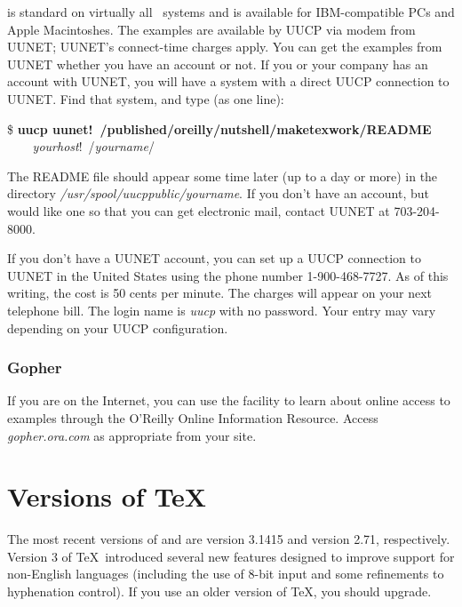  is standard on virtually all \Unix\ systems
and is available for IBM-compatible PCs and Apple Macintoshes. The examples
are available by UUCP via modem from UUNET; UUNET's connect-time charges
apply. You can get the examples from UUNET whether you have an account or
not. If you or your company has an account with UUNET, you will have a system
with a direct UUCP connection to UUNET. Find that system, and type (as one
line):

\begin{ttindent}
\$ \textbf{uucp uunet\ttbackslash!~/published/oreilly/nutshell/maketexwork/README \ttbackslash} 
\textit{\ \ \ \ yourhost}\ttbackslash!~/\textit{yourname}/
\end{ttindent}

The README file should appear some time later (up to a day or more) in the
directory {\it /usr/spool/uucppublic/yourname}. If you don't have an account,
but would like one so that you can get electronic mail, contact UUNET at
703-204-8000.

If you don't have a UUNET account, you can set up a UUCP connection to UUNET
in the United States using the phone number 1-900-468-7727. As of this
writing, the cost is 50 cents per minute. The charges will appear on your next
telephone bill. The login name is \textit{uucp} with no password. Your entry may vary
depending on your UUCP configuration.

\subsubsection{Gopher}

If you are on the Internet, you can use the
 facility to learn about
online access to examples through the O'Reilly Online Information Resource.
Access {\it gopher.ora.com} as appropriate from your site.

\section{Versions of \protect\TeX}

The most recent versions of  and
 are version 3.1415 and version 2.71,
respectively.  Version 3 of \TeX\ introduced several new features designed to
improve support for non-English languages (including the use of 8-bit input
and some refinements to hyphenation control).  If you use an older version of
\TeX, you should upgrade.

